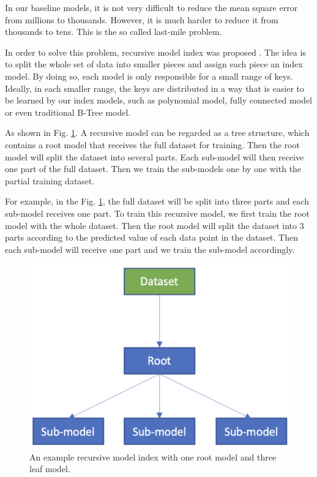 
In our baseline models, it is not very difficult to reduce the mean square error from millions to thousands. However, it is much harder to reduce it from thousands to tens. This is the so called last-mile problem.

In order to solve this problem, recursive model index was proposed \cite{kraska2018case}. The idea is to split the whole set of data into smaller pieces and assign each piece an index model. By doing so, each model is only responsible for a small range of keys. Ideally, in each smaller range, the keys are distributed in a way that is easier to be learned by our index models, such as polynomial model, fully connected model or even traditional B-Tree model.

As shown in Fig. \ref{rmi_structure}. A recursive model can be regarded as a tree structure, which contains a root model that receives the full dataset for training. Then the root model will split the dataset into several parts. Each sub-model will then receive one part of the full dataset. Then we train the sub-models one by one with the partial training dataset. 

\begin{mscexample}
	For example, in the Fig. \ref{rmi_structure}, the full dataset will be split into three parts and each sub-model receives one part. To train this recursive model, we first train the root model with the whole dataset. Then the root model will split the dataset into 3 parts according to the predicted value of each data point in the dataset. Then each sub-model will receive one part and we train the sub-model accordingly.
\end{mscexample}

\begin{figure}[h]
\centering
\includegraphics[scale=0.4]{graphs/rmi_demo}
\caption{An example recursive model index with one root model and three leaf model.}
\label{rmi_structure}
\end{figure}



